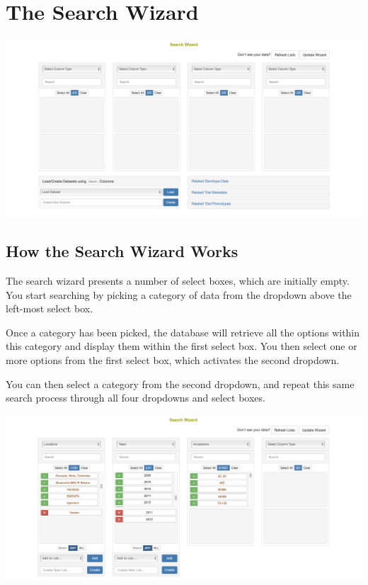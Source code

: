 \documentclass[
  12pt,
]{book}
\begin{document}
\hypertarget{search-wizard}{%
\section{The Search Wizard}\label{search-wizard}}

\begin{center}\includegraphics[width=0.95\linewidth]{assets/images/wizard_interface} \end{center}

\hypertarget{how-the-search-wizard-works}{%
\subsection{How the Search Wizard Works}\label{how-the-search-wizard-works}}

The search wizard presents a number of select boxes, which are initially empty. You start searching by picking a category of data from the dropdown above the left-most select box.

Once a category has been picked, the database will retrieve all the options within this category and display them within the first select box. You then select one or more options from the first select box, which activates the second dropdown.

You can then select a category from the second dropdown, and repeat this same search process through all four dropdowns and select boxes.

\begin{center}\includegraphics[width=0.95\linewidth]{assets/images/wizard_interface_selections} \end{center}
\end{document}
